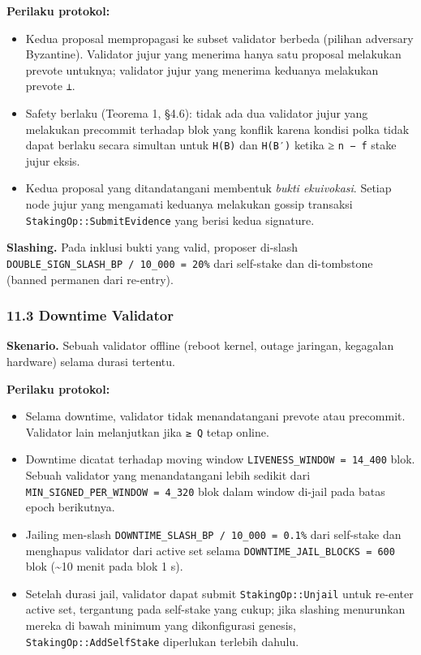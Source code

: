 \documentclass[11pt,a4paper]{article}
\providecommand{\tightlist}{\setlength{\itemsep}{0pt}\setlength{\parskip}{0pt}}
\begin{document}
\textbf{Perilaku protokol:}

\begin{itemize}
\tightlist
\item
  Kedua proposal mempropagasi ke subset validator berbeda (pilihan adversary Byzantine). Validator jujur yang menerima hanya satu proposal melakukan prevote untuknya; validator jujur yang menerima keduanya melakukan prevote \texttt{⊥}.
\item
  Safety berlaku (Teorema 1, §4.6): tidak ada dua validator jujur yang melakukan precommit terhadap blok yang konflik karena kondisi polka tidak dapat berlaku secara simultan untuk \texttt{H(B)} dan \texttt{H(B′)} ketika ≥ \texttt{n\ −\ f} stake jujur eksis.
\item
  Kedua proposal yang ditandatangani membentuk \emph{bukti ekuivokasi}. Setiap node jujur yang mengamati keduanya melakukan gossip transaksi \texttt{StakingOp::SubmitEvidence} yang berisi kedua signature.
\end{itemize}

\textbf{Slashing.} Pada inklusi bukti yang valid, proposer di-slash \texttt{DOUBLE\_SIGN\_SLASH\_BP\ /\ 10\_000\ =\ 20\%} dari self-stake dan di-tombstone (banned permanen dari re-entry).

\hypertarget{downtime-validator}{%
\subsubsection{11.3 Downtime Validator}\label{downtime-validator}}

\textbf{Skenario.} Sebuah validator offline (reboot kernel, outage jaringan, kegagalan hardware) selama durasi tertentu.

\textbf{Perilaku protokol:}

\begin{itemize}
\tightlist
\item
  Selama downtime, validator tidak menandatangani prevote atau precommit. Validator lain melanjutkan jika \texttt{≥\ Q} tetap online.
\item
  Downtime dicatat terhadap moving window \texttt{LIVENESS\_WINDOW\ =\ 14\_400} blok. Sebuah validator yang menandatangani lebih sedikit dari \texttt{MIN\_SIGNED\_PER\_WINDOW\ =\ 4\_320} blok dalam window di-jail pada batas epoch berikutnya.
\item
  Jailing men-slash \texttt{DOWNTIME\_SLASH\_BP\ /\ 10\_000\ =\ 0.1\%} dari self-stake dan menghapus validator dari active set selama \texttt{DOWNTIME\_JAIL\_BLOCKS\ =\ 600} blok (\textasciitilde10 menit pada blok 1 s).
\item
  Setelah durasi jail, validator dapat submit \texttt{StakingOp::Unjail} untuk re-enter active set, tergantung pada self-stake yang cukup; jika slashing menurunkan mereka di bawah minimum yang dikonfigurasi genesis, \texttt{StakingOp::AddSelfStake} diperlukan terlebih dahulu.
\end{itemize}
\end{document}
